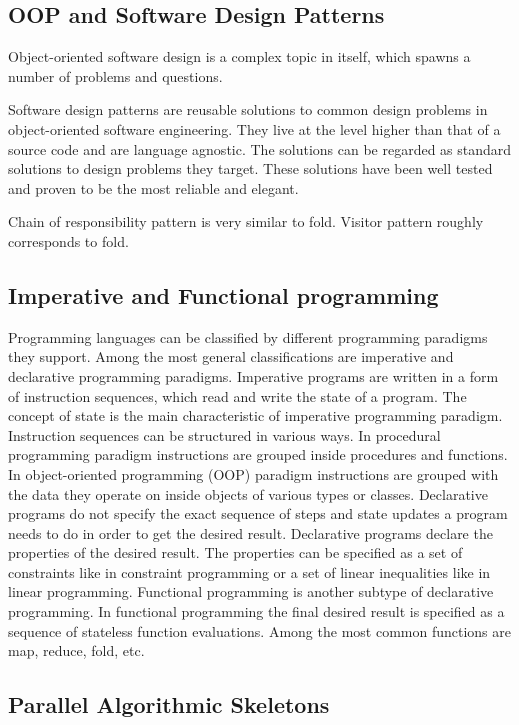 \documentclass[10pt,a4paper]{report}
\begin{document}
\subsection{OOP and Software Design Patterns}
\quad Object-oriented software design is a complex topic in itself, which spawns a number of problems and questions. 

\quad Software design patterns are reusable solutions to common design problems in object-oriented software engineering. They live at the level higher than that of a source code and are language agnostic. The solutions can be regarded as standard solutions to design problems they target. These solutions have been well tested and proven to be the most reliable and elegant.

Chain of responsibility pattern is very similar to fold.
Visitor pattern roughly corresponds to fold.

\subsection{Imperative and Functional programming}
\quad Programming languages can be classified by different programming paradigms they support. Among the most general classifications are imperative and declarative programming paradigms.\newline\null
\quad Imperative programs are written in a form of instruction sequences, which read and write the state of a program. The concept of state is the main characteristic of imperative programming paradigm. Instruction sequences can be structured in various ways. In procedural programming paradigm instructions are grouped inside procedures and functions. In object-oriented programming (OOP) paradigm instructions are grouped with the data they operate on inside objects of various types or classes.\newline\null
\quad Declarative programs do not specify the exact sequence of steps and state updates a program needs to do in order to get the desired result. Declarative programs declare the properties of the desired result. The properties can be specified as a set of constraints like in constraint programming or a set of linear inequalities like in linear programming. Functional programming is another subtype of declarative programming. In functional programming the final desired result is specified as a sequence of stateless function evaluations. Among the most common functions are map, reduce, fold, etc.

\subsection{Parallel Algorithmic Skeletons}
\end{document}
